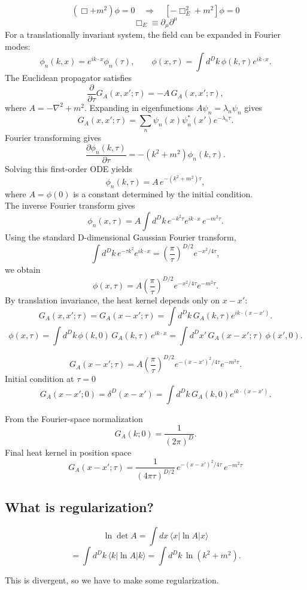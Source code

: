 \documentclass[14pt]{article} %
\begin{document}
\[
(\Box + m^2)\phi = 0 \quad \Rightarrow \quad [-\Box_E^2 + m^2]\phi = 0
\]
\[
\Box_E \equiv \partial_\mu \partial^\mu
\]
For a translationally invariant system, the field can be expanded in Fourier modes:
\[
\phi_n(k, x) = e^{ik \cdot x} \phi_n(\tau), \qquad
\phi(x, \tau) = \int d^D k \, \phi(k, \tau) e^{ik \cdot x}.
\]
The Euclidean propagator satisfies
\[
\frac{\partial}{\partial \tau} G_A(x, x'; \tau) = - A \, G_A(x, x'; \tau),
\]
where \(A = -\nabla^2 + m^2\). Expanding in eigenfunctions \(A \psi_n = \lambda_n \psi_n\) gives
\[
G_A(x, x'; \tau) = \sum_n \psi_n(x) \psi_n^*(x') e^{-\lambda_n \tau}.
\]
Fourier transforming gives
\[
\frac{\partial \phi_n(k, \tau)}{\partial \tau} = - (k^2 + m^2) \phi_n(k, \tau).
\]
Solving this first-order ODE yields
\[
\phi_n(k, \tau) = A \, e^{-(k^2 + m^2)\tau},
\]
where \(A = \phi(0)\) is a constant determined by the initial condition.\\
The inverse Fourier transform gives
\[
\phi_n(x, \tau) = A \int d^D k \, e^{-k^2 \tau} e^{ik \cdot x} \, e^{-m^2 \tau}.
\]
Using the standard D-dimensional Gaussian Fourier transform,
\[
\int d^D k \, e^{- \tau k^2} e^{i k \cdot x} = \left( \frac{\pi}{\tau} \right)^{D/2} e^{- x^2 / 4\tau},
\]
we obtain
\[
\phi(x, \tau) = A \left( \frac{\pi}{\tau} \right)^{D/2} e^{-x^2 / 4\tau} e^{-m^2 \tau}.
\]
By translation invariance, the heat kernel depends only on \(x - x'\):
\[
G_A(x, x'; \tau) = G_A(x - x'; \tau) = \int d^D k \, G_A(k, \tau) e^{ik \cdot (x - x')}.
\]
\[
\phi(x, \tau) = \int d^D k \, \phi(k, 0) \, G_A(k, \tau) \, e^{i k \cdot x}
= \int d^D x' \, G_A(x - x'; \tau) \, \phi(x', 0).
\]

\[
G_A(x - x'; \tau) = A \left( \frac{\pi}{\tau} \right)^{D/2} e^{-(x - x')^2 / 4\tau} e^{-m^2 \tau}.
\]
Initial condition at $\tau = 0$
\[
G_A(x - x'; 0) = \delta^D(x - x') = \int d^D k \, G_A(k, 0) e^{ik \cdot (x - x')}.
\]

From the Fourier-space normalization
\[
G_A(k; 0) = \frac{1}{(2\pi)^D}.
\]
 Final heat kernel in position space
\[
\boxed{
G_A(x - x'; \tau) = \frac{1}{(4\pi \tau)^{D/2}} \, e^{-(x - x')^2 / 4\tau} \, e^{-m^2 \tau}
}
\]
\subsection{What is regularization?}
\[
\ln \det A = \int dx \, \langle x|\ln A|x\rangle
\]
\[
= \int d^D k \, \langle k|\ln A|k\rangle
= \int d^D k \, \ln(k^2+m^2).
\]

This is divergent, so we have to make some regularization.
\end{document}
